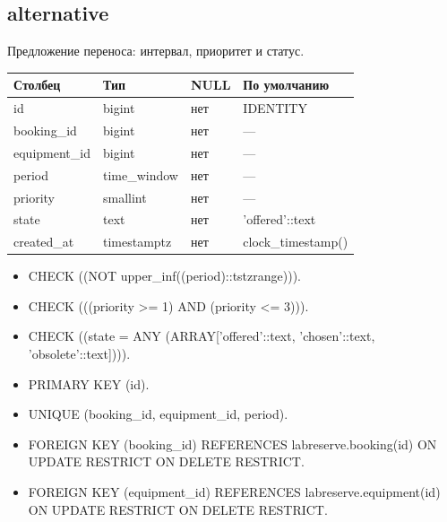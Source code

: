 \par\noindent\begin{minipage}{\linewidth}
\subsection{alternative}
Предложение переноса: интервал, приоритет и статус.\par\smallskip\noindent
\begin{tabular}{p{}p{}p{}p{}}
\toprule Столбец & Тип & NULL & По умолчанию \\ \midrule
id & bigint & нет & IDENTITY \\
booking\_\allowbreak{}id & bigint & нет & — \\
equipment\_\allowbreak{}id & bigint & нет & — \\
period & time\_\allowbreak{}window & нет & — \\
priority & smallint & нет & — \\
state & text & нет & 'offered'::text \\
created\_\allowbreak{}at & timestamptz & нет & clock\_\allowbreak{}timestamp() \\
\bottomrule\end{tabular}\end{minipage}\par
\begin{itemize}
\item CHECK ((NOT upper\_\allowbreak{}inf((period)::tstzrange))).
\item CHECK (((priority >= 1) AND (priority <= 3))).
\item CHECK ((state = ANY (ARRAY['offered'::text, 'chosen'::text, 'obsolete'::text]))).
\item PRIMARY KEY (id).
\item UNIQUE (booking\_\allowbreak{}id, equipment\_\allowbreak{}id, period).
\item FOREIGN KEY (booking\_\allowbreak{}id) REFERENCES labreserve.booking(id) ON UPDATE RESTRICT ON DELETE RESTRICT.
\item FOREIGN KEY (equipment\_\allowbreak{}id) REFERENCES labreserve.equipment(id) ON UPDATE RESTRICT ON DELETE RESTRICT.
\end{itemize}

